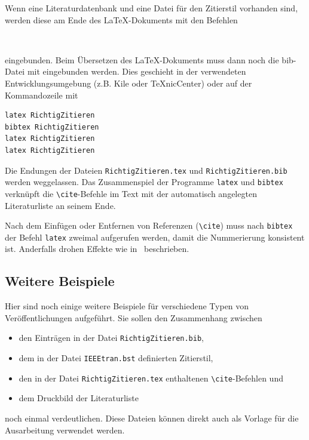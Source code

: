 \documentclass[a4paper, 10pt]{article}
\begin{document}
Wenn eine Literaturdatenbank und eine Datei f\"ur den Zitierstil vorhanden
sind, werden diese am Ende des \LaTeX-Dokuments mit den Befehlen
\begin{verbatim}


\end{verbatim}
eingebunden. Beim \"Ubersetzen des \LaTeX-Dokuments muss dann noch die
bib-Datei mit eingebunden werden. Dies geschieht in der verwendeten
Entwicklungsumgebung (z.B. Kile oder TeXnicCenter) oder auf der Kommandozeile
mit
\begin{verbatim}
latex RichtigZitieren
bibtex RichtigZitieren
latex RichtigZitieren
latex RichtigZitieren
\end{verbatim}
Die Endungen der Dateien \verb+RichtigZitieren.tex+ und
\verb+RichtigZitieren.bib+ werden weggelassen. Das Zusammenspiel der Programme
\verb+latex+ und \verb+bibtex+ verkn\"upft die \verb+\cite+-Befehle im Text mit
der automatisch angelegten Literaturliste an seinem Ende.

Nach dem Einf\"ugen oder Entfernen
von Referenzen (\verb+\cite+) muss nach \verb+bibtex+ der Befehl \verb+latex+
zweimal aufgerufen werden, damit die Nummerierung konsistent ist. Anderfalls
drohen Effekte wie in~\cite[Kap.~15]{Coe:House_of_Sleep:1997} beschrieben.


\subsection{Weitere Beispiele}

Hier sind noch einige weitere Beispiele f\"ur verschiedene Typen von
Ver\"offentlichungen aufgef\"uhrt. Sie sollen den Zusammenhang zwischen 
\begin{itemize}
 \item den Eintr\"agen in der Datei \verb+RichtigZitieren.bib+,
 \item dem in der Datei \verb+IEEEtran.bst+ definierten Zitierstil,
 \item den in der Datei \verb+RichtigZitieren.tex+ enthaltenen
\verb+\cite+-Befehlen und
\item dem Druckbild der Literaturliste
\end{itemize}
noch einmal verdeutlichen. Diese Dateien k\"onnen direkt auch als Vorlage f\"ur
die Ausarbeitung verwendet werden.
\end{document}
